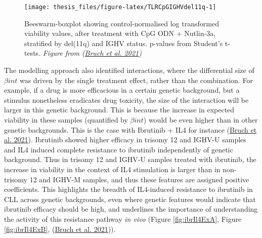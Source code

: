 \documentclass[11pt, a4paper, twosided]{book}
\begin{document}
\begin{figure}

{\centering \texttt{[image: thesis\_files/figure-latex/TLRCpGIGHVdel11q-1]} 

}

\caption{Beeswarm-boxplot showing control-normalised log transformed viability values, after treatment with CpG ODN + Nutlin-3a, stratified by del(11q) and IGHV status. p-values from Student's t-tests. \emph{Figure from (\protect\hyperlink{ref-Giles2021}{Bruch et al. 2021})}}\label{fig:TLRCpGIGHVdel11q}
\end{figure}
The modelling approach also identified interactions, where the differential size of \(\beta{int}\) was driven by the single treatment effect, rather than the combination. For example, if a drug is more efficacious in a certain genetic background, but a stimulus nonetheless eradicates drug toxicity, the size of the interaction will be larger in this genetic background. This is because the increase in expected viability in these samples (quantified by \(\beta{int}\)) would be even higher than in other genetic backgrounds. This is the case with Ibrutinib + IL4 for instance (\protect\hyperlink{ref-Giles2021}{Bruch et al. 2021}). Ibrutinib showed higher efficacy in trisomy 12 and IGHV-U samples and IL4 induced complete resistance to ibrutinib independently of genetic background. Thus in trisomy 12 and IGHV-U samples treated with ibrutinib, the increase in viability in the context of IL4 stimulation is larger than in non-trisomy 12 and IGHV-M samples, and thus these features are assigned positive coefficients. This highlights the breadth of IL4-induced resistance to ibrutinib in CLL across genetic backgrounds, even where genetic features would indicate that ibrutinib efficacy should be high, and underlines the importance of understanding the activity of this resistance pathway \emph{in vivo} (Figure \ref{fig:ibrIl4ExA}, Figure \ref{fig:ibrIl4ExB}, (\protect\hyperlink{ref-Giles2021}{Bruch et al. 2021})).
\end{document}
